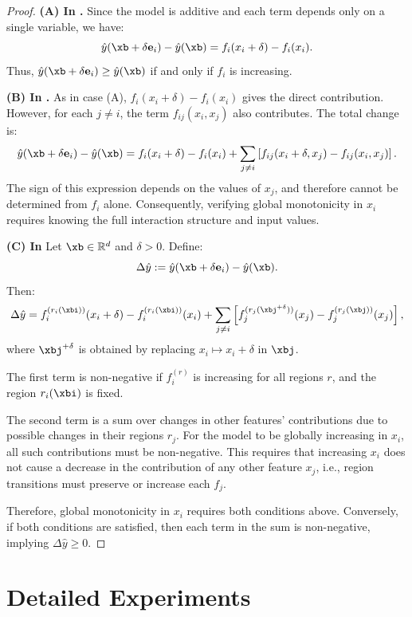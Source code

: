 \begin{proof}

\textbf{(A) In \gam.}
Since the model is additive and each term depends only on a single variable, we have:
\[
\hat{y}(\xb + \delta \mathbf{e}_i) - \hat{y}(\xb) = f_i(x_i + \delta) - f_i(x_i).
\]
Thus, \( \hat{y}(\xb + \delta \mathbf{e}_i) \ge \hat{y}(\xb) \) if and only if \( f_i \) is increasing. 

\textbf{(B) In \gamm.}  As in case (A), \( f_i(x_i + \delta) - f_i(x_i) \) gives the direct contribution. However, for each \( j \ne i \), the term \( f_{ij}(x_i, x_j) \) also contributes. The total change is:
\[
\hat{y}(\xb + \delta \mathbf{e}_i) - \hat{y}(\xb) = f_i(x_i + \delta) - f_i(x_i)
+ \sum_{j \ne i} \left[ f_{ij}(x_i + \delta, x_j) - f_{ij}(x_i, x_j) \right].
\]
The sign of this expression depends on the values of \( x_j \), and therefore cannot be determined from \( f_i \) alone. Consequently, verifying global monotonicity in \( x_i \) requires knowing the full interaction structure and input values. 

\textbf{(C) In \method{}}
Let \( \xb \in \mathbb{R}^d \) and \( \delta > 0 \). Define:
\[
\Delta \hat{y} := \hat{y}(\xb + \delta \mathbf{e}_i) - \hat{y}(\xb).
\]
Then:
\[
\Delta \hat{y} =
f_i^{(r_i(\xbi))}(x_i + \delta) - f_i^{(r_i(\xbi))}(x_i)
+ \sum_{j \ne i} \left[
f_j^{(r_j(\xbj^{+\delta}))}(x_j) - f_j^{(r_j(\xbj))}(x_j)
\right],
\]
where \( \xbj^{+\delta} \) is obtained by replacing \( x_i \mapsto x_i + \delta \) in \( \xbj \).

The first term is non-negative if \( f_i^{(r)} \) is increasing for all regions \( r \), and the region \( r_i(\xbi) \) is fixed.

The second term is a sum over changes in other features' contributions due to possible changes in their regions \( r_j \). For the model to be globally increasing in \( x_i \), all such contributions must be non-negative. This requires that increasing \( x_i \) does not cause a decrease in the contribution of any other feature \( x_j \), i.e., region transitions must preserve or increase each \( f_j \).

Therefore, global monotonicity in \( x_i \) requires both conditions above. Conversely, if both conditions are satisfied, then each term in the sum is non-negative, implying \( \Delta \hat{y} \ge 0 \). 

\end{proof}

\newpage
\section{Detailed Experiments}\label{app:detailed-experiments}

